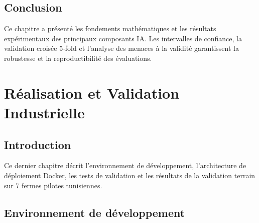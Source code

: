 \section*{Conclusion}
Ce chapitre a présenté les fondements mathématiques et les résultats
expérimentaux des principaux composants IA. Les intervalles de confiance,
la validation croisée 5-fold et l'analyse des menaces à la validité
garantissent la robustesse et la reproductibilité des évaluations.

\chapter{Réalisation et Validation Industrielle}
\section*{Introduction}
Ce dernier chapitre décrit l'environnement de développement, l'architecture
de déploiement Docker, les tests de validation et les résultats de la
validation terrain sur 7 fermes pilotes tunisiennes.

\section{Environnement de développement}


